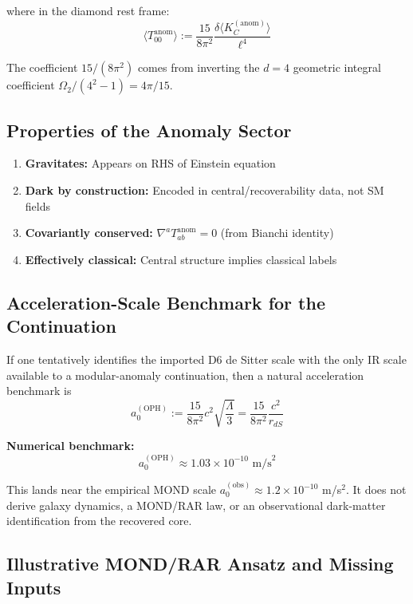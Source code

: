 where in the diamond rest frame: \[\langle T_{00}^{\text{anom}} \rangle := \frac{15}{8\pi^2} \frac{\delta\langle K_C^{(\text{anom})} \rangle}{\ell^4}\]

The coefficient \(15/(8\pi^2)\) comes from inverting the \(d=4\) geometric integral coefficient \(\Omega_2/(4^2-1) = 4\pi/15\).

\subsection{Properties of the Anomaly Sector}\label{93-properties-of-the-anomaly-sector}

\begin{enumerate}
\def\labelenumi{\arabic{enumi}.}
\tightlist
\item
 \textbf{Gravitates:} Appears on RHS of Einstein equation
\item
 \textbf{Dark by construction:} Encoded in central/recoverability data, not SM fields
\item
 \textbf{Covariantly conserved:} \(\nabla^a T_{ab}^{\text{anom}} = 0\) (from Bianchi identity)
\item
 \textbf{Effectively classical:} Central structure implies classical labels
\end{enumerate}

\subsection{Acceleration-Scale Benchmark for the Continuation}\label{94-the-mond-acceleration-scale}

If one tentatively identifies the imported D6 de Sitter scale with the only IR scale available to a modular-anomaly continuation, then a natural acceleration benchmark is \[a_0^{(\text{OPH})} := \frac{15}{8\pi^2} c^2 \sqrt{\frac{\Lambda}{3}} = \frac{15}{8\pi^2} \frac{c^2}{r_{dS}}\]

\textbf{Numerical benchmark:} \[a_0^{(\text{OPH})} \approx 1.03 \times 10^{-10} \text{ m/s}^2\]

This lands near the empirical MOND scale \(a_0^{(\text{obs})} \approx 1.2 \times 10^{-10}\) m/s\(^2\). It does not derive galaxy dynamics, a MOND/RAR law, or an observational dark-matter identification from the recovered core.

\subsection{Illustrative MOND/RAR Ansatz and Missing Inputs}\label{95-polarization-response-mond-like-scaling}

